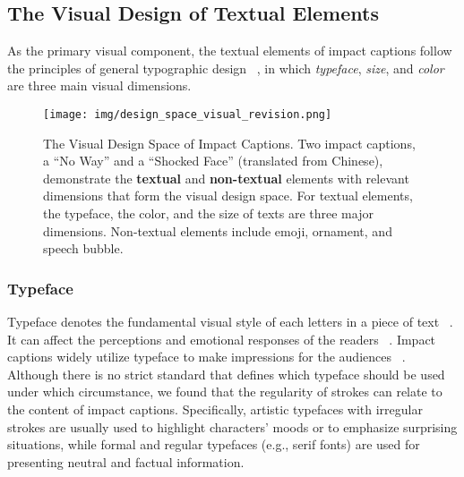 \subsection{The Visual Design of Textual Elements}
As the primary visual component, the textual elements of impact captions follow the principles of general typographic design ~\cite{carter2011typographic}, in which \emph{typeface}, \emph{size}, and \emph{color} are three main visual dimensions.


\begin{figure}[htb]
    \texttt{[image: img/design\_space\_visual\_revision.png]}
    \caption{The Visual Design Space of Impact Captions.
    Two impact captions, a ``No Way'' and a ``Shocked Face'' (translated from Chinese), demonstrate the \textbf{textual} and \textbf{non-textual} elements with relevant dimensions that form the visual design space. 
    For textual elements, the typeface, the color, and the size of texts are three major dimensions. 
    Non-textual elements include emoji, ornament, and speech bubble.}
    \label{fig:ds_visual_elements}
\end{figure}

\subsubsection{Typeface}
Typeface denotes the fundamental visual style of each letters in a piece of text ~\cite{carter2011typographic}. It can affect the perceptions and emotional responses of the readers ~\cite{bianchi2021emotional, amare2012seeing}. 
Impact captions widely utilize typeface to make impressions for the audiences ~\cite{sasamoto2021hookability}. 
Although there is no strict standard that defines which typeface should be used under which circumstance, we found that the regularity of strokes can relate to the content of impact captions. Specifically, artistic typefaces with irregular strokes are usually used to highlight characters' moods or to emphasize surprising situations, while formal and regular typefaces (e.g., serif fonts) are used for presenting neutral and factual information.


